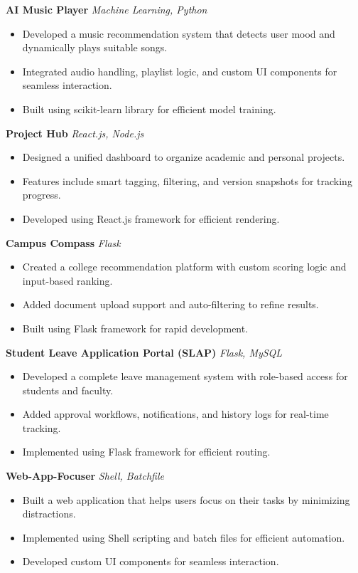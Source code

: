\documentclass[a4paper,12pt]{article}
\begin{document}
\textbf{AI Music Player}  
\textit{Machine Learning, Python}
\begin{itemize}
    \item Developed a music recommendation system that detects user mood and dynamically plays suitable songs.
    \item Integrated audio handling, playlist logic, and custom UI components for seamless interaction.
    \item Built using scikit-learn library for efficient model training.
\end{itemize}

\textbf{Project Hub}  
\textit{React.js, Node.js}
\begin{itemize}
    \item Designed a unified dashboard to organize academic and personal projects.
    \item Features include smart tagging, filtering, and version snapshots for tracking progress.
    \item Developed using React.js framework for efficient rendering.
\end{itemize}

\textbf{Campus Compass}  
\textit{Flask}
\begin{itemize}
    \item Created a college recommendation platform with custom scoring logic and input-based ranking.
    \item Added document upload support and auto-filtering to refine results.
    \item Built using Flask framework for rapid development.
\end{itemize}

\textbf{Student Leave Application Portal (SLAP)}  
\textit{Flask, MySQL}
\begin{itemize}
    \item Developed a complete leave management system with role-based access for students and faculty.
    \item Added approval workflows, notifications, and history logs for real-time tracking.
    \item Implemented using Flask framework for efficient routing.
\end{itemize}

\textbf{Web-App-Focuser}  
\textit{Shell, Batchfile}
\begin{itemize}
    \item Built a web application that helps users focus on their tasks by minimizing distractions.
    \item Implemented using Shell scripting and batch files for efficient automation.
    \item Developed custom UI components for seamless interaction.
\end{itemize}
\end{document}
